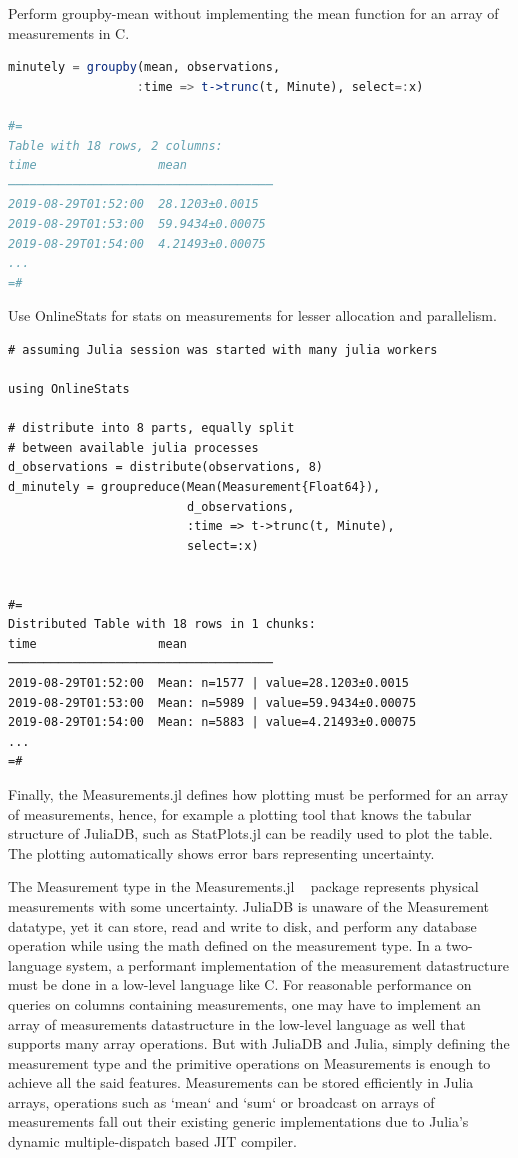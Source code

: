 \documentclass{juliacon}
\begin{document}
Perform groupby-mean without implementing the
mean function for an array of measurements in C.

\begin{lstlisting}[language=Julia]
minutely = groupby(mean, observations,
                  :time => t->trunc(t, Minute), select=:x)

#=
Table with 18 rows, 2 columns:
time                 mean
─────────────────────────────────────
2019-08-29T01:52:00  28.1203±0.0015
2019-08-29T01:53:00  59.9434±0.00075
2019-08-29T01:54:00  4.21493±0.00075
...
=#
\end{lstlisting}

Use OnlineStats for stats on measurements for lesser allocation and parallelism.

\begin{lstlisting}
# assuming Julia session was started with many julia workers

using OnlineStats

# distribute into 8 parts, equally split
# between available julia processes
d_observations = distribute(observations, 8)
d_minutely = groupreduce(Mean(Measurement{Float64}),
                         d_observations,
                         :time => t->trunc(t, Minute),
                         select=:x)


#=
Distributed Table with 18 rows in 1 chunks:
time                 mean
─────────────────────────────────────
2019-08-29T01:52:00  Mean: n=1577 | value=28.1203±0.0015
2019-08-29T01:53:00  Mean: n=5989 | value=59.9434±0.00075
2019-08-29T01:54:00  Mean: n=5883 | value=4.21493±0.00075
...
=#
\end{lstlisting}

Finally, the Measurements.jl defines how plotting must be performed for an array of measurements, hence, for example a plotting tool that knows the tabular structure of JuliaDB, such as StatPlots.jl can be readily used to plot the table. The plotting automatically shows error bars representing uncertainty.

The Measurement type in the Measurements.jl ~\cite{giordano2016} package represents physical measurements with some uncertainty. JuliaDB is unaware of the Measurement datatype, yet it can store, read and write to disk, and perform any database operation while using the math defined on the measurement type. In a two-language system, a performant implementation of the measurement datastructure must be done in a low-level language like C. For reasonable performance on queries on columns containing measurements, one may have to implement an array of measurements datastructure in the low-level language as well that supports many array operations. But with JuliaDB and Julia, simply defining the measurement type and the primitive operations on Measurements is enough to achieve all the said features. Measurements can be stored efficiently in Julia arrays, operations such as `mean` and `sum` or broadcast on arrays of measurements fall out their existing generic implementations due to Julia's dynamic multiple-dispatch based JIT compiler.
\end{document}
